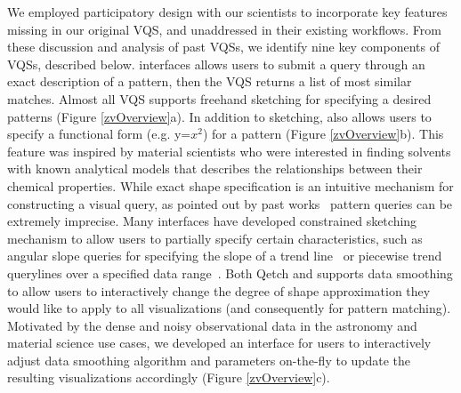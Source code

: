 \par We employed participatory design with our scientists to incorporate key features missing in our original VQS, and unaddressed in their existing workflows. From these discussion and analysis of past VQSs, we identify nine key components of VQSs, described below. %
 interfaces allows users to submit a query through an exact description of a pattern, then the VQS returns a list of most similar matches. Almost all VQS supports freehand sketching for specifying a desired patterns (Figure \ref{zvOverview}a). In addition to sketching, \zv also allows users to specify a functional form (e.g. y=$x^2$) for a pattern (Figure \ref{zvOverview}b). This feature was inspired by material scientists who were interested in finding solvents with known analytical models that describes the relationships between their chemical properties.
 While exact shape specification is an intuitive mechanism for constructing a visual query, as pointed out by past works~\cite{correll2016semantics,Holz2009} pattern queries can be extremely imprecise. Many interfaces have developed constrained sketching mechanism to allow users to partially specify certain characteristics, such as angular slope queries for specifying the slope of a trend line~\cite{Hochheiser2004} or piecewise trend querylines over a specified data range~\cite{ryall2005querylines}. Both Qetch and \zv supports data smoothing to allow users to interactively change the degree of shape approximation they would like to apply to all visualizations (and consequently for pattern matching). Motivated by the dense and noisy observational data in the astronomy and material science use cases, we developed an interface for users to interactively adjust data smoothing algorithm and parameters on-the-fly to update the resulting visualizations accordingly (Figure \ref{zvOverview}c).
